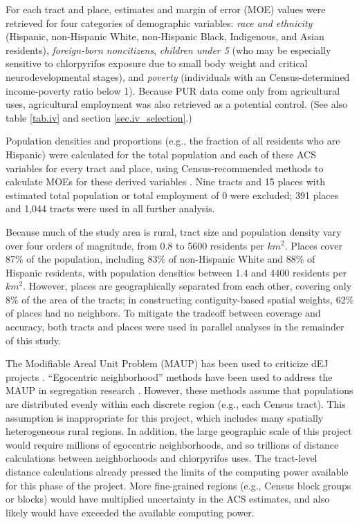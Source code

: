 \documentclass[ijerph,article,submit,oneauthor,pdftex]{Definitions/mdpi}
\begin{document}
For each tract and place, estimates and margin of error (MOE) values were retrieved for four categories of demographic variables: \emph{race and ethnicity} (Hispanic, non-Hispanic White, non-Hispanic Black, Indigenous, and Asian residents), \emph{foreign-born noncitizens}, \emph{children under 5} (who may be especially sensitive to chlorpyrifos exposure due to small body weight and critical neurodevelopmental stages), and \emph{poverty} (individuals with an Census-determined income-poverty ratio below 1). Because PUR data come only from agricultural uses, agricultural employment was also retrieved as a potential control. (See also table \ref{tab.iv} and section \ref{sec.iv_selection}.)

Population densities and proportions (e.g., the fraction of all residents who are Hispanic) were calculated for the total population and each of these ACS variables for every tract and place, using Census-recommended methods to calculate MOEs for these derived variables \citep[p 11ff]{USCensusBureauAmericanCommunitySurvey}. Nine tracts and 15 places with estimated total population or total employment of 0 were excluded; 391 places and 1,044 tracts were used in all further analysis.

Because much of the study area is rural, tract size and population density vary over four orders of magnitude, from 0.8 to 5600 residents per \(km^2\). Places cover 87\% of the population, including 83\% of non-Hispanic White and 88\% of Hispanic residents, with population densities between 1.4 and 4400 residents per \(km^2\). However, places are geographically separated from each other, covering only 8\% of the area of the tracts; in constructing contiguity-based spatial weights, 62\% of places had no neighbors. To mitigate the tradeoff between coverage and accuracy, both tracts and places were used in parallel analyses in the remainder of this study.

The Modifiable Areal Unit Problem (MAUP) has been used to criticize dEJ projects \citep[p 41ff]{SteelEnvironmentalJusticeValues2012, TaylorToxicCommunitiesEnvironmental2014}. ``Egocentric neighborhood'' methods have been used to address the MAUP in segregation research \citep{ReardonMeasuresSpatialSegregation2004}. However, these methods assume that populations are distributed evenly within each discrete region (e.g., each Census tract). This assumption is inappropriate for this project, which includes many spatially heterogeneous rural regions. In addition, the large geographic scale of this project would require millions of egocentric neighborhoods, and so trillions of distance calculations between neighborhoods and chlorpyrifos uses. The tract-level distance calculations already pressed the limits of the computing power available for this phase of the project. More fine-grained regions (e.g., Census block groups or blocks) would have multiplied uncertainty in the ACS estimates, and also likely would have exceeded the available computing power.
\end{document}
